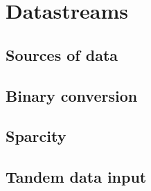 \chapter{Datastreams}
\section{Sources of data}

\section{Binary conversion}

\section{Sparcity}

\section{Tandem data input}

